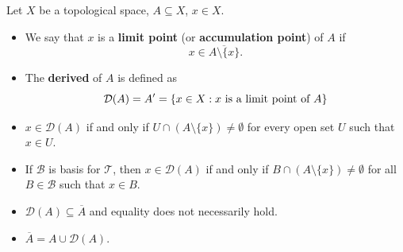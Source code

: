 \begin{definition}
    Let \( X  \) be a topological space, \( A \subseteq X  \), \( x \in X  \).  
\begin{itemize}
    \item We say that \( x  \) is a \textbf{limit point} (or \textbf{accumulation point}) of \( A  \) if 
        \[  x \in \overline{A \setminus  \{ x  \} }. \]
    \item The \textbf{derived} of \( A  \) is defined as 
        \[  \mathcal{D}(A) = A' = \{ x \in X : \text{\( x  \) is a limit point of \( A  \)} \}  \]
\end{itemize}
\end{definition}

\begin{remark}
   \begin{itemize}
       \item \( x \in \mathcal{D}(A)  \) if and only if \( U \cap (A \setminus  \{ x  \} ) \neq \emptyset \) for every open set \( U  \) such that \( x \in U  \).
        \item If \( \mathcal{B}  \) is basis for \( \mathcal{T} \), then \( x \in \mathcal{D}(A) \) if and only if \( B \cap (A \setminus \{ x \} ) \neq \emptyset \) for all \( B \in \mathcal{B} \) such that \( x \in B  \).
        \item \( \mathcal{D}(A) \subseteq \overline{A} \) and equality does not necessarily hold.
        \item \( \overline{A} = A \cup \mathcal{D}(A) \).
   \end{itemize} 
\end{remark}
